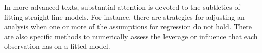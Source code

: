 In more advanced texts, substantial attention is devoted to the subtleties of fitting straight line models. For instance, there are strategies for adjusting an analysis when one or more of the assumptions for regression do not hold. There are also specific methods to numerically assess the leverage or influence that each observation has on a fitted model.


